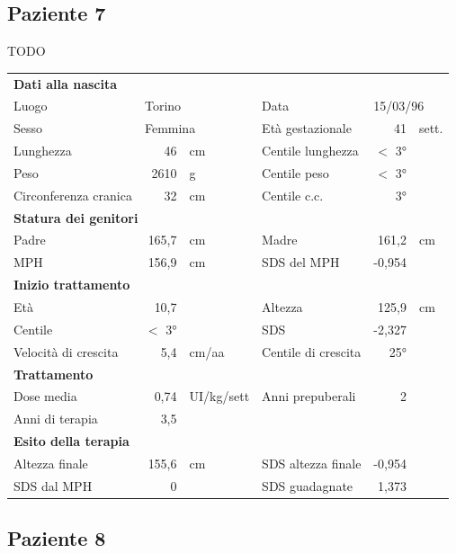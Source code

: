 \subsection*{Paziente 7}%

TODO

\begin{table}[!h]
\begin{tabular}{lrllrl}
\toprule
\multicolumn{6}{l}{\textbf{Dati alla nascita}}\\
Luogo 		& \multicolumn{2}{l}{Torino} 	& Data 					& \multicolumn{2}{l}{15/03/96} 	\\
Sesso 		& \multicolumn{2}{l}{Femmina} 	& Età gestazionale 		& 41 		& sett.\\
Lunghezza 	& 46 		& cm 				& Centile lunghezza		& $<$ 3° 		\\
Peso 		& 2610 		& g					& Centile peso			& $<$ 3° 		\\
Circonferenza cranica	& 32 		& cm 	& Centile c.c.			& 3° \\
\midrule
\multicolumn{6}{l}{\textbf{Statura dei genitori}}\\
Padre 		& 165,7 & cm 	& Madre 				& 161,2 & cm \\
MPH 		& 156,9 & cm 	& SDS del MPH 			& -0,954\\
\midrule
\multicolumn{6}{l}{\textbf{Inizio trattamento}} \\
Età	& 10,7 & 		& Altezza 				& 125,9 & cm  \\
Centile & $<$ 3° 	 &		& SDS		& -2,327 \\
Velocità di crescita & 5,4 & cm/aa	& Centile di crescita & 25°\\
\midrule
\multicolumn{6}{l}{\textbf{Trattamento}} \\
Dose media		& 0,74 & UI/kg/sett & Anni prepuberali & 2\\
Anni di terapia & 3,5\\
\midrule
\multicolumn{6}{l}{\textbf{Esito della terapia}} \\
Altezza finale			& 155,6 & cm 	& SDS altezza finale		& -0,954\\
SDS dal MPH				& 0 &		& SDS guadagnate 			& 1,373\\
\bottomrule
\end{tabular}
\end{table}
\clearpage

\subsection*{Paziente 8}

